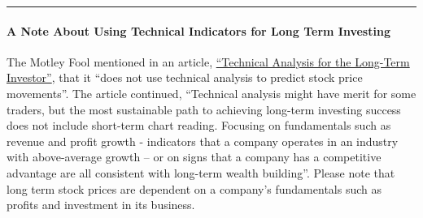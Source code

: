 \documentclass[11pt]{article}
\begin{document}
\begin{center}\rule{0.5\linewidth}{0.5pt}\end{center}

\hypertarget{a-note-about-using-technical-indicators-for-long-term-investing}{%
\paragraph{A Note About Using Technical Indicators for Long Term
Investing}\label{a-note-about-using-technical-indicators-for-long-term-investing}}

The Motley Fool mentioned in an article,
\href{https://www.fool.com/investing/how-to-invest/stocks/technical-analysis/}{``Technical
Analysis for the Long-Term Investor''}, that it ``does not use technical
analysis to predict stock price movements''. The article continued,
``Technical analysis might have merit for some traders, but the most
sustainable path to achieving long-term investing success does not
include short-term chart reading. Focusing on fundamentals such as
revenue and profit growth - indicators that a company operates in an
industry with above-average growth -- or on signs that a company has a
competitive advantage are all consistent with long-term wealth
building''. Please note that long term stock prices are dependent on a
company's fundamentals such as profits and investment in its business.
\end{document}
